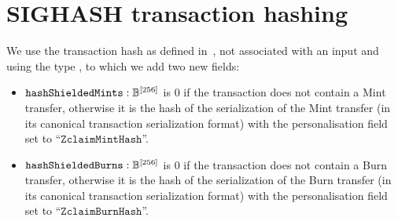 \section{SIGHASH transaction hashing}
\label{app:sighash}

We use the \sighash transaction hash as defined in~\cite{ZIP243}, not associated with an input and using the \sighash type \sighashall, to which we add two new fields:
\begin{itemize}
    \item $\mathtt{hashShieldedMints} :  \mathbb{B}^{[256]}$ is 0 if the transaction does not contain a Mint transfer, otherwise it is the \blakezclaim hash of the serialization of the Mint transfer (in its canonical transaction serialization format) with the personalisation field set to ``$\mathtt{ZclaimMintHash}$''.
    \item $\mathtt{hashShieldedBurns} :  \mathbb{B}^{[256]}$ is 0 if the transaction does not contain a Burn transfer, otherwise it is the \blakezclaim hash of the serialization of the Burn transfer (in its canonical transaction serialization format) with the personalisation field set to ``$\mathtt{ZclaimBurnHash}$''.
\end{itemize}
